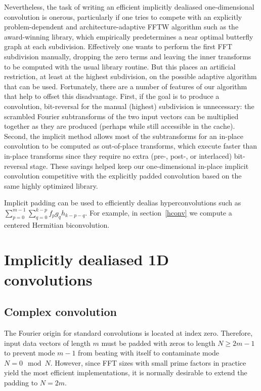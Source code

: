 \documentclass[final]{siamltex}
\begin{document}
Nevertheless, the task of writing an efficient implicitly dealiased
one-dimensional convolution is onerous, particularly if one tries to
compete with an explicitly problem-dependent and architecture-adaptive
FFTW algorithm such as the award-winning \cite{FFTW} library, which
empirically predetermines a near optimal butterfly graph
at each subdivision. Effectively one wants to perform
the first FFT subdivision manually, dropping the zero terms and
leaving the inner transforms to be computed with the usual library
routine. But this places an artificial restriction, at least at the
highest subdivision, on the possible adaptive algorithm that can be
used. Fortunately, there are a number of features of our algorithm
that help to offset this disadvantage. First, if the goal is to
produce a convolution, bit-reversal for the manual (highest)
subdivision is unnecessary: the scrambled Fourier subtransforms of the
two input vectors can be multiplied together as they are produced
(perhaps while still accessible in the cache). Second, the implicit
method allows most of the subtransforms for an in-place convolution to
be computed as out-of-place transforms, which execute faster than
in-place transforms since they require no extra (pre-, post-, or
interlaced) bit-reversal stage.  These savings helped keep our
one-dimensional in-place implicit convolution competitive with the
explicitly padded convolution based on the same highly optimized
library.

Implicit padding can be used to efficiently dealias hyperconvolutions
such as $\sum_{p=0}^{m-1}\sum_{q=0}^{k-p} f_p g_q h_{k-p-q}$. 
For example, in section~\ref{hconv} we compute a centered Hermitian
biconvolution.

\section{Implicitly dealiased 1D convolutions}
\subsection{Complex convolution}
The Fourier origin for standard convolutions is located at index zero.
Therefore, input data vectors of length $m$ must be padded with zeros to
length $N\ge 2m-1$ to prevent mode $m-1$ from beating with itself to
contaminate mode~$N=0\mod N$. However, since FFT sizes with small prime
factors in practice yield the most efficient implementations, it is normally
desirable to extend the padding to $N=2m$.
\end{document}
